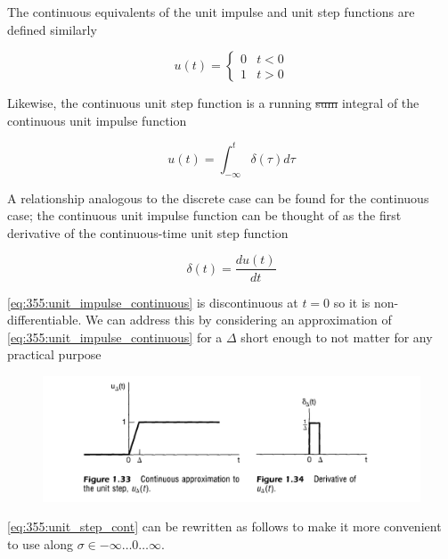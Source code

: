 \documentclass[10pt]{article}
\begin{document}
The continuous equivalents of the unit impulse and unit step functions are defined similarly

\begin{definition}
	
\begin{equation}
	u(t) = \begin{cases}
		0 & t < 0 \\
		1 & t > 0
	\end{cases}
\end{equation}
\end{definition}


Likewise, the continuous unit step function is a running \st{sum} integral of the continuous unit impulse function

\begin{equation}
	u(t) = \int^{t}_{-\infty} \delta(\tau)d\tau
	\label{eq:355:unit_step_cont}
\end{equation}


A relationship analogous to the discrete case can be found for the continuous case; the continuous unit impulse function can be thought of as the first derivative of the continuous-time unit step function

\begin{definition}
\begin{equation}
	\delta(t) = \frac{du(t)}{dt}
	\label{eq:355:unit_impulse_continuous}
\end{equation}
	
\end{definition}


\eqref{eq:355:unit_impulse_continuous} is discontinuous at $ t=0 $ so it is non-differentiable. We can address this by considering an approximation of \eqref{eq:355:unit_impulse_continuous} for a $ \Delta $ short enough to not matter for any practical purpose

\begin{figure}[H]
	\centering
	\includegraphics[width=0.8\linewidth]{img/image_2022-09-16-16-53-20.png}
\end{figure}


\eqref{eq:355:unit_step_cont} can be rewritten as follows to make it more convenient to use along $ \sigma\in-\infty\ldots 0\ldots\infty$. 
\end{document}
